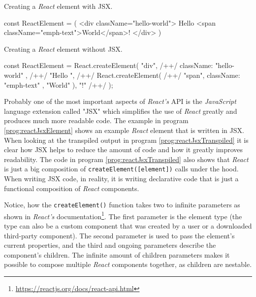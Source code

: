 \begin{program}
\caption{Creating a \emph{React} element with JSX.} 
\label{prog:reactJsxElement}
\begin{JsCode}
const ReactElement = (
  <div className="hello-world">
    Hello <span className="emph-text">World</span>!
  </div>
)
\end{JsCode}
\end{program}

\begin{program}
\caption{Creating a \emph{React} element without JSX.} 
\label{prog:reactJsxTranspiled}
\begin{JsCode}
const ReactElement = React.createElement(
  "div", /+\label{line:createReactComponent1}+/
  { className: "hello-world" }, /+\label{line:createReactComponent2}+/
  "Hello ", /+\label{line:childrenStart}+/
  React.createElement( /+\label{line:nestedCreateElement}+/
    "span", 
    { className: "emph-text" }, 
    "World"
  ), 
  "!" /+\label{line:childrenEnd}+/
);
\end{JsCode}
\end{program}

Probably one of the most important aspects of \emph{React's} API is the \emph{JavaScript} language extension called "JSX" which simplifies the use of \emph{React} greatly and produces much more readable code. The example in program \ref{prog:reactJsxElement} shows an example \emph{React} element that is written in JSX. When looking at the transpiled output in program \ref{prog:reactJsxTranspiled} it is clear how JSX helps to reduce the amount of code and how it greatly improves readability. The code in program \ref{prog:reactJsxTranspiled} also shows that \emph{React} is just a big composition of \texttt{createElement([element])} calls under the hood. When writing JSX code, in reality, it is writing declarative code that is just a functional composition of \emph{React} components. 

Notice, how the \texttt{createElement()} function takes two to infinite parameters as shown in \emph{React's} documentation\footnote{\url{https://reactjs.org/docs/react-api.html}}. The first parameter is the element type (the type can also be a custom component that was created by a user or a downloaded third-party component). The second parameter is used to pass the element's current properties, and the third and ongoing parameters describe the component's children. The infinite amount of children parameters makes it possible to compose multiple \emph{React} components together, as children are nestable. 

